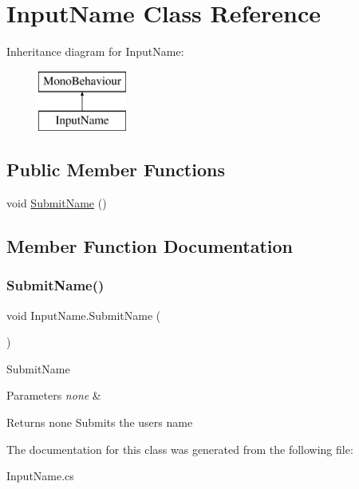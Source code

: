 \hypertarget{class_input_name}{}\section{Input\+Name Class Reference}
\label{class_input_name}
Inheritance diagram for Input\+Name\+:\begin{figure}[H]
\begin{center}
\leavevmode
\includegraphics[height=2.000000cm]{class_input_name}
\end{center}
\end{figure}
\subsection*{Public Member Functions}
\begin{DoxyCompactItemize}
\item 
void \mbox{\hyperlink{class_input_name_af7ccce069e27f5fb0aea884e9d882d42}{Submit\+Name}} ()
\end{DoxyCompactItemize}


\subsection{Member Function Documentation}
\mbox{\label{class_input_name_af7ccce069e27f5fb0aea884e9d882d42}} 
\subsubsection{\texorpdfstring{Submit\+Name()}{SubmitName()}}
{\footnotesize\ttfamily void Input\+Name.\+Submit\+Name (\begin{DoxyParamCaption}{ }\end{DoxyParamCaption})\hspace{0.3cm}{\ttfamily [inline]}}

Submit\+Name 
\begin{DoxyParams}{Parameters}
{\em none} & \\
\hline
\end{DoxyParams}
\begin{DoxyReturn}{Returns}
none Submits the user\textquotesingle{}s name 
\end{DoxyReturn}


The documentation for this class was generated from the following file\+:\begin{DoxyCompactItemize}
\item 
Input\+Name.\+cs\end{DoxyCompactItemize}
